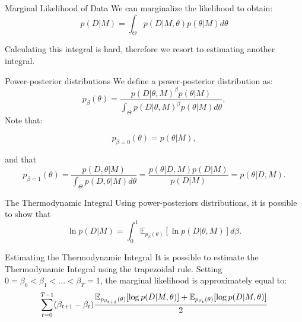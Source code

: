 \documentclass{beamer}
\newcommand{\expectation}{\mathbb{E}}
\begin{document}
\begin{frame}{Marginal Likelihood of Data}
We can marginalize the likelihood to obtain:
\begin{equation*}
    p (D | M) = \int_{\Theta} p (D | M, \theta) p (\theta | M)d\theta
\end{equation*}

\pause
Calculating this integral is hard, therefore we resort to estimating
another integral.
\end{frame}


\begin{frame}{Power-posterior distributions}
We define a power-posterior distribution as:
\begin{equation*}
    p_{\beta} (\theta) = \frac{p (D | \theta, M)^\beta p(\theta | M)}
                    {\int_\Theta p (D | \theta, M)^\beta p(\theta | M) 
                    d\theta},
\end{equation*}
\pause
Note that:

\begin{equation*}
    p_{\beta=0} (\theta) = p (\theta | M),
\end{equation*}

\pause
and that
\begin{equation*}
    p_{\beta=1}(\theta) =\frac{p (D, \theta|M)}
                              {\int_\Theta p (D, \theta | M)d\theta}
                        =\frac{p(\theta | D, M) p(D|M)}{p (D | M)}
                        =p (\theta | D, M).
\end{equation*}
\end{frame}


\begin{frame}{The Thermodynamic Integral}
Using power-posteriors distributions, it is possible to show that
\pause
\begin{equation*}
    \ln p (D | M) = \int_0^1 \expectation_{p_\beta (\theta)} 
        [\ln p(D|\theta, M)]d\beta.
    \label{eq:marginal_likelihood_again}
\end{equation*}
\end{frame}


\begin{frame}{Estimating the Thermodynamic Integral}
It is possible to estimate the Thermodynamic Integral using the 
trapezoidal rule. \pause Setting $0 = \beta_0 < \beta_1 < \ldots 
< \beta_T = 1$, the marginal likelihood is approximately equal to:
\pause
\begin{equation*}
    \footnotesize
    \sum_{t = 0}^{T - 1} (\beta_{t + 1} - \beta_t)
\frac{
    \expectation_{p_{\beta_{t + 1}} (\theta)}[\log p(D | M, \theta)]
+ 
    \expectation_{p_{\beta_{t}} (\theta)}[\log p(D | M, \theta)]}
{2}
\end{equation*}
\end{frame}
\end{document}
